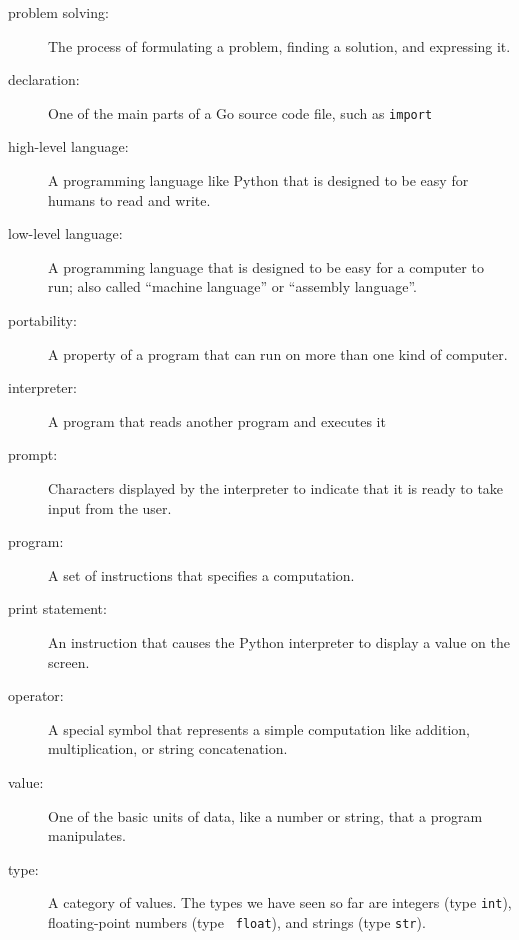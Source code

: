 \begin{description}

\item[problem solving:]  The process of formulating a problem, finding
a solution, and expressing it.

\item[declaration:] One of the main parts of a Go source code file, such
as {\tt import}

\item[high-level language:]  A programming language like Python that
is designed to be easy for humans to read and write.

\item[low-level language:]  A programming language that is designed
to be easy for a computer to run; also called ``machine language'' or
``assembly language''.

\item[portability:]  A property of a program that can run on more
than one kind of computer.

\item[interpreter:]  A program that reads another program and executes
it

\item[prompt:] Characters displayed by the interpreter to indicate
that it is ready to take input from the user.

\item[program:] A set of instructions that specifies a computation.

\item[print statement:]  An instruction that causes the Python
interpreter to display a value on the screen.

\item[operator:]  A special symbol that represents a simple computation like
addition, multiplication, or string concatenation.

\item[value:]  One of the basic units of data, like a number or string, 
that a program manipulates.

\item[type:] A category of values. The types we have seen so far
are integers (type {\tt int}), floating-point numbers (type {\tt
float}), and strings (type {\tt str}).


\end{description}
